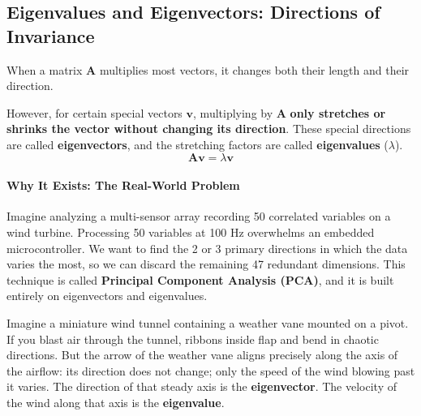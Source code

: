 \subsection{Eigenvalues and Eigenvectors: Directions of Invariance}

\begin{keyidea}
When a matrix $\mathbf{A}$ multiplies most vectors, it changes both their length and their direction. 

However, for certain special vectors $\mathbf{v}$, multiplying by $\mathbf{A}$ \textbf{only stretches or shrinks the vector without changing its direction}. These special directions are called \textbf{eigenvectors}, and the stretching factors are called \textbf{eigenvalues} ($\lambda$).
\begin{equation}
\mathbf{A}\mathbf{v} = \lambda \mathbf{v}\label{eq:eigen_def}
\end{equation}
\end{keyidea}

\paragraph{Why It Exists: The Real-World Problem}
Imagine analyzing a multi-sensor array recording 50 correlated variables on a wind turbine. Processing 50 variables at 100 Hz overwhelms an embedded microcontroller. We want to find the 2 or 3 primary directions in which the data varies the most, so we can discard the remaining 47 redundant dimensions. This technique is called \textbf{Principal Component Analysis (PCA)}, and it is built entirely on eigenvectors and eigenvalues.

\begin{analogy}
Imagine a miniature wind tunnel containing a weather vane mounted on a pivot. If you blast air through the tunnel, ribbons inside flap and bend in chaotic directions. But the arrow of the weather vane aligns precisely along the axis of the airflow: its direction does not change; only the speed of the wind blowing past it varies. The direction of that steady axis is the \textbf{eigenvector}. The velocity of the wind along that axis is the \textbf{eigenvalue}.
\end{analogy}


